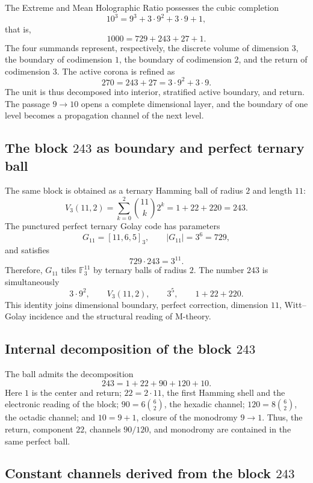 The Extreme and Mean Holographic Ratio possesses the cubic completion
\[
10^3=9^3+3\cdot9^2+3\cdot9+1,
\]
that is,
\[
1000=729+243+27+1.
\]
The four summands represent, respectively, the discrete volume of
dimension \(3\), the boundary of codimension \(1\), the boundary of
codimension \(2\), and the return of codimension \(3\). The active corona
is refined as
\[
270=243+27=3\cdot9^2+3\cdot9.
\]
The unit is thus decomposed into interior, stratified active boundary, and
return. The passage \(9\to10\) opens a complete dimensional layer, and the boundary
of one level becomes a propagation channel of the next level.

\subsection{The block \texorpdfstring{\(243\)}{243} as boundary and perfect ternary ball}

The same block is obtained as a ternary Hamming ball of radius \(2\) and
length \(11\):
\[
V_3(11,2)
=\sum_{k=0}^{2}\binom{11}{k}2^k
=1+22+220
=243.
\]
The punctured perfect ternary Golay code has parameters
\[
G_{11}=[11,6,5]_3,
\qquad
|G_{11}|=3^6=729,
\]
and satisfies
\[
729\cdot243=3^{11}.
\]
Therefore, \(G_{11}\) tiles \(\mathbb F_3^{11}\) by ternary balls of
radius \(2\). The number \(243\) is simultaneously
\[
3\cdot9^2,
\qquad
V_3(11,2),
\qquad
3^5,
\qquad
1+22+220.
\]
This identity joins dimensional boundary, perfect correction, dimension
\(11\), Witt--Golay incidence and the structural reading of M-theory.

\subsection{Internal decomposition of the block \texorpdfstring{\(243\)}{243}}

The ball admits the decomposition
\[
243=1+22+90+120+10.
\]
Here \(1\) is the center and return; \(22=2\cdot11\), the first Hamming shell
and the electronic reading of the block; \(90=6\binom62\), the hexadic channel;
\(120=8\binom62\), the octadic channel; and \(10=9+1\), closure of the
monodromy \(9\to1\). Thus, the return, component \(22\), channels \(90/120\), and
monodromy are contained in the same perfect ball.

\subsection{Constant channels derived from the block \texorpdfstring{\(243\)}{243}}

